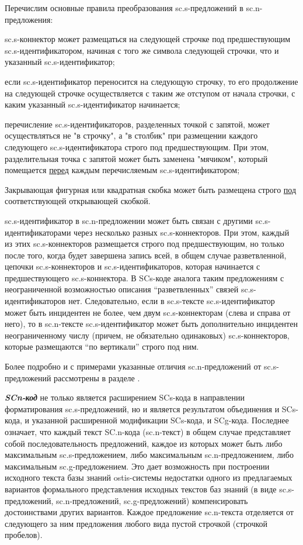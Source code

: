 \begin{SCn}
{Перечислим основные правила преобразования sc.s-предложений в sc.n-предложения:
\begin{scnitemize}
\item sc.s-коннектор может размещаться на следующей строчке под предшествующим sc.s-идентификатором, начиная с того же символа следующей строчки, что и указанный sc.s-идентификатор;
\item если sc.s-идентификатор переносится на следующую строчку, то его продолжение на следующей строчке осуществляется с таким же отступом от начала строчки, с каким указанный sc.s-идентификатор начинается;
\item перечисление sc.s-идентификаторов, разделенных точкой с запятой, может осуществляться не "в строчку", а "в столбик" при размещении каждого следующего sc.s-идентификатора строго под предшествующим. При этом, разделительная точка с запятой может быть заменена "мячиком", который помещается \uline{перед} каждым перечисляемым sc.s-идентификатором;
\item Закрывающая фигурная или квадратная скобка может быть размещена строго \uline{под} соответствующей открывающей скобкой.
\item sc.s-идентификатор в sc.n-предложении может быть связан с другими sc.s-идентификаторами через несколько разных sc.s-коннекторов. При этом, каждый из этих sc.s-коннекторов размещается строго под предшествующим, но только после того, когда будет завершена запись всей, в общем случае разветвленной, цепочки sc.s-коннекторов и sc.s-идентификаторов, которая начинается с предшествующего sc.s-коннектора. В SCs-коде аналога таким предложениям с неограниченной возможностью описания “разветвленных” связей sc.s-идентификаторов нет. Следовательно, если в sc.s-тексте sc.s-идентификатор может быть инцидентен не более, чем двум sc.s-коннекторам (слева и справа от него), то в sc.n-тексте sc.s-идентификатор может быть дополнительно инцидентен неограниченному числу (причем, не обязательно одинаковых) sc.s-коннекторов, которые размещаются “по вертикали” строго под ним.
\end{scnitemize}

Более подробно и с примерами указанные отличия sc.n-предложений от sc.s-предложений рассмотрены в разделе  .

\textbf{\textit{SCn-код}} не только является расширением SCs-кода в направлении форматирования sc.s-предложений, но и является результатом объединения и SCs-кода, и указанной расширенной модификации SCs-кода, и SCg-кода. Последнее означает, что каждый текст SC.n-кода (sc.n-текст) в общем случае представляет собой последовательность предложений, каждое из которых может быть либо максимальным sc.s-предложением, либо максимальным sc.n-предложением, либо максимальным sc.g-предложением. Это дает возможность при построении исходного текста базы знаний ostis-системы недостатки одного из предлагаемых вариантов формального представления исходных текстов баз знаний (в виде sc.s-предложений, sc.n-предложений, sc.g-предложений) компенсировать достоинствами других вариантов. Каждое предложение sc.n-текста отделяется от следующего за ним предложения любого вида пустой строчкой (строчкой пробелов).

}
\end{SCn}
